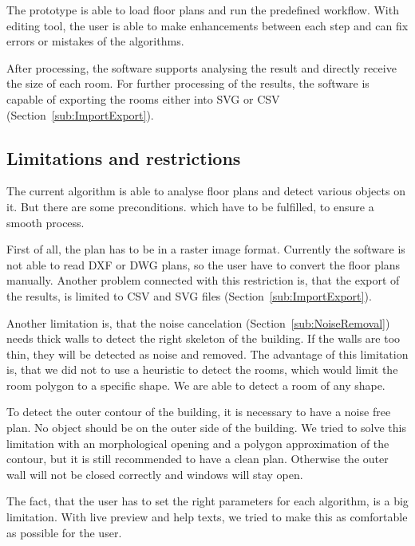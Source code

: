 The prototype is able to load floor plans and run the predefined workflow. With editing tool, the user is able to make enhancements between each step and can fix errors or mistakes of the algorithms.

After processing, the software supports analysing the result and directly receive the size of each room. For further processing of the results, the software is capable of exporting the rooms either into SVG or CSV (Section~\ref{sub:ImportExport}).

\subsection{Limitations and restrictions}
The current algorithm is able to analyse floor plans and detect various objects on it. But there are some preconditions. which have to be fulfilled, to ensure a smooth process.

First of all, the plan has to be in a raster image format. Currently the software is not able to read DXF or DWG plans, so the user have to convert the floor plans manually. Another problem connected with this restriction is, that the export of the results, is limited to CSV and SVG files (Section~\ref{sub:ImportExport}).

Another limitation is, that the noise cancelation (Section~\ref{sub:NoiseRemoval}) needs thick walls to detect the right skeleton of the building. If the walls are too thin, they will be detected as noise and removed. The advantage of this limitation is, that we did not to use a heuristic to detect the rooms, which would limit the room polygon to a specific shape. We are able to detect a room of any shape.

To detect the outer contour of the building, it is necessary to have a noise free plan. No object should be on the outer side of the building. We tried to solve this limitation with an morphological opening and a polygon approximation of the contour, but it is still recommended to have a clean plan. Otherwise the outer wall will not be closed correctly and windows will stay open.

The fact, that the user has to set the right parameters for each algorithm, is a big limitation. With live preview and help texts, we tried to make this as comfortable as possible for the user.

